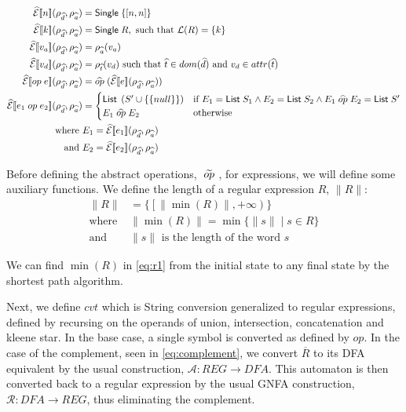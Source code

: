 \begin{align}\label{sem:exp1}
    \absexpsem{n}(\rho_{\ab{d}}, \rho_{\ab{a}}) &= \mathsf{Single} \; \{ [n, n] \} \\\label{sem:exp2}
    \absexpsem{k}(\rho_{\ab{d}}, \rho_{\ab{a}}) &= \mathsf{Single} \; R,  \text{ such that }\mathcal{L}(R) = \{ k \} \\ \label{sem:exp3}
    \absexpsem{v_a}(\rho_{\ab{d}}, \rho_{\ab{a}}) &=  \rho_{\ab{a}}(v_a) \\ \label{sem:exp4}
    \absexpsem{v_d}(\rho_{\ab{d}}, \rho_{\ab{a}}) &=  \rho_{\ab{t}}(v_d) \text{ such that } \ab{t} \in dom(\ab{d}) \text{ and } v_d \in attr(\ab{t}) \\ \label{eq:exp-lookup}
    \absexpsem{op \; e}(\rho_{\ab{d}}, \rho_{\ab{a}}) &= \ab{op} \; (\absexpsem{e}(\rho_{\ab{d}}, \rho_{\ab{a}})) \\ \label{eq:unary-op}
    \absexpsem{e_1 \;op\; e_2}(\rho_{\ab{d}}, \rho_{\ab{a}}) &=
    \begin{cases}
        \mathsf{List} \; \left(S' \cup \{\{null\}\} \right) & \text{if } E_1 = \mathsf{List} \; S_1 \land E_2 = \mathsf{List} \; S_2 \land E_1 \;\ab{op}\; E_2 = \mathsf{List} \; S'\\
        E_1 \;\ab{op}\; E_2 & \text{otherwise}\\
    \end{cases} \\
    \text{where } & E_1 = \absexpsem{e_1}(\rho_{\ab{d}}, \rho_{\ab{a}}) \\
    \text{and } & E_2 = \absexpsem{e_2}(\rho_{\ab{d}}, \rho_{\ab{a}})
\end{align}

Before defining the abstract operations, $\;\widetilde{op}\;$, for expressions, we will define some auxiliary functions.
We define the length of a regular expression $R$, $\|R\|$:
\begin{align}\label{eq:r1}
    \|R\| & = \{ \left[ \|\min(R)\|, +\infty \right) \} \\
    \text{where } & \|\min(R)\| = \min\{ \|s\| \mid s \in R \} \\ \label{eq:r2}
    \text{and } & \|s\| \text{ is the length of the word $s$}
\end{align}

We can find $\min(R)$ in \autoref{eq:r1} from the initial state to any final state by the shortest path algorithm.

Next, we define $cvt$ which is String conversion generalized to regular expressions, defined by recursing on the operands of union, intersection, concatenation and kleene star.
In the base case, a single symbol is converted as defined by $op$.
In the case of the complement, seen in \autoref{eq:complement}, we convert $\overline{R}$ to its DFA equivalent by the usual construction, $\mathcal{A}:REG\rightarrow DFA$. 
This automaton is then converted back to a regular expression by the usual GNFA construction, $\mathcal{R}: DFA\rightarrow REG$, thus eliminating the complement. 

